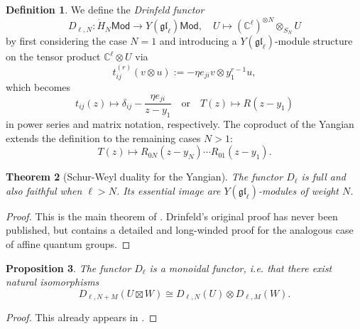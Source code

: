 \documentclass[11pt]{report}
\newtheorem{theorem}{Theorem}[section]
\newtheorem{prop}[theorem]{Proposition}
\theoremstyle{definition}
\newtheorem{definition}[theorem]{Definition}
\theoremstyle{remark}
\theoremstyle{remark}
\newcommand{\C}{\mathbb{C}}
\begin{document}
\begin{definition}
We define the \emph{Drinfeld functor}
\begin{equation*}
D_{\ell,N}: \dot H_N\mathsf{Mod} \to Y(\mathfrak{gl}_\ell)\mathsf{Mod}, \quad U \mapsto (\C^\ell)^{\otimes N} \otimes_{S_N} U
\end{equation*}
by first considering the case $N=1$ and introducing a $Y(\mathfrak{gl}_\ell)$-module structure on the tensor product $\C^\ell \otimes U$ via
\begin{equation*}
t_{ij}^{(r)}(v \otimes u) := -\eta e_{ji} v \otimes y_1^{r-1} u,
\end{equation*}
which becomes
\begin{equation*}
t_{ij}(z) \mapsto \delta_{ij} - \frac{\eta e_{ji}}{z-y_1} \quad \text{or} \quad T(z) \mapsto R(z-y_1)
\end{equation*}
in power series and matrix notation, respectively. The coproduct of the Yangian extends the definition to the remaining cases $N > 1$:
\begin{equation*}
T(z) \mapsto R_{0N}(z-y_N) \cdots R_{01}(z-y_1).
\end{equation*}
\end{definition}

\begin{theorem}[Schur-Weyl duality for the Yangian]
The functor $D_\ell$ is full and also faithful when $\ell > N$. Its essential image are $Y(\mathfrak{gl}_\ell)$-modules of weight $N$.
\end{theorem}

\begin{proof}
This is the main theorem of \cite{article:drinfeld:1986}. Drinfeld's original proof has never been published, but \cite{article:chari:1995} contains a detailed and long-winded proof for the analogous case of affine quantum groups.
\end{proof}

\begin{prop}
The functor $D_\ell$ is a monoidal functor, \emph{i.e.} that there exist natural isomorphisms
\begin{equation*}
D_{\ell,N+M}(U \boxtimes W) \cong D_{\ell,N}(U) \otimes D_{\ell,M}(W).
\end{equation*}
\end{prop}

\begin{proof}
This already appears in \cite{article:drinfeld:1986}.
\end{proof}
\end{document}
